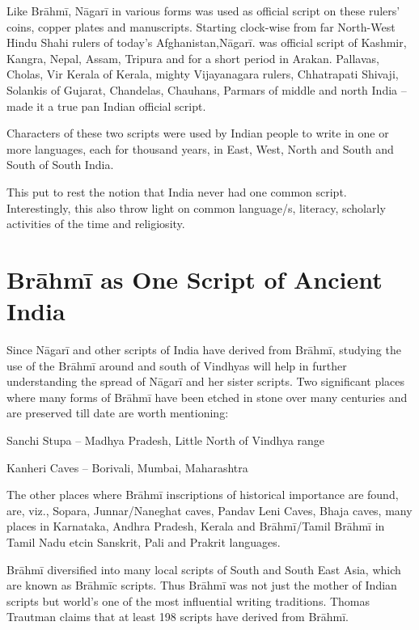 Like Brāhmī, Nāgarī in various forms was used as official script on these rulers’ coins, copper plates and manuscripts. Starting clock-wise from far North-West Hindu Shahi rulers of today’s Afghanistan,Nāgarī. was official script of Kashmir, Kangra, Nepal, Assam, Tripura and for a short period in Arakan. Pallavas, Cholas, Vir Kerala of Kerala, mighty Vijayanagara rulers, Chhatrapati Shivaji, Solankis of Gujarat, Chandelas, Chauhans, Parmars of middle and north India – made it a true pan Indian official script.

Characters of these two scripts were used by Indian people to write in one or more languages, each for thousand years, in East, West, North and South and South of South India.

This put to rest the notion that India never had one common script. Interestingly, this also throw light on common language/s, literacy, scholarly activities of the time and religiosity.


\section*{Brāhmī as One Script of Ancient India}

Since Nāgarī and other scripts of India have derived from Brāhmī, studying the use of the Brāhmī around and south of Vindhyas will help in further understanding the spread of Nāgarī and her sister scripts. Two significant places where many forms of Brāhmī have been etched in stone over many centuries and are preserved till date are worth mentioning:

\item Sanchi Stupa – Madhya Pradesh, Little North of Vindhya range

 \item Kanheri Caves – Borivali, Mumbai, Maharashtra

The other places where Brāhmī inscriptions of historical importance are found, are, viz., Sopara, Junnar/Naneghat caves, Pandav Leni Caves, Bhaja caves, many places in Karnataka, Andhra Pradesh, Kerala and Brāhmī/Tamil Brāhmī in Tamil Nadu etcin Sanskrit, Pali and Prakrit languages.

Brāhmī diversified into many local scripts of South and South East Asia, which are known as Brāhmīc scripts. Thus Brāhmī was not just the mother of Indian scripts but world’s one of the most influential writing traditions. Thomas Trautman claims that at least 198 scripts have derived from Brāhmī.


